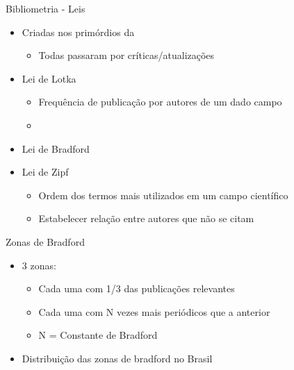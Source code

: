 \documentclass[bigger]{beamer}
\begin{document}
\begin{frame}[label={sec:orga62bedb}]{Bibliometria - Leis}
\begin{itemize}
\item Criadas nos primórdios da
\begin{itemize}
\item Todas passaram por críticas/atualizações
\end{itemize}

\item Lei de Lotka
\begin{itemize}
\item Frequência de publicação por autores de um dado campo
\item 
\end{itemize}
\item Lei de Bradford
\item Lei de Zipf
\begin{itemize}
\item Ordem dos termos mais utilizados em um campo científico
\item Estabelecer relação entre autores que não se citam
\end{itemize}
\end{itemize}
\end{frame}

\begin{frame}[label={sec:orgb031106}]{Zonas de Bradford}
\begin{itemize}
\item 3 zonas:
\begin{itemize}
\item Cada uma com 1/3 das publicações relevantes
\item Cada uma com N vezes mais periódicos que a anterior
\item N = Constante de Bradford
\end{itemize}
\end{itemize}
\end{frame}

\begin{frame}[label={sec:org54ff4ba}]{\cite{mugnaini2019}}
\begin{itemize}
\item Distribuição das zonas de bradford no Brasil
\end{itemize}
\end{frame}
\end{document}

